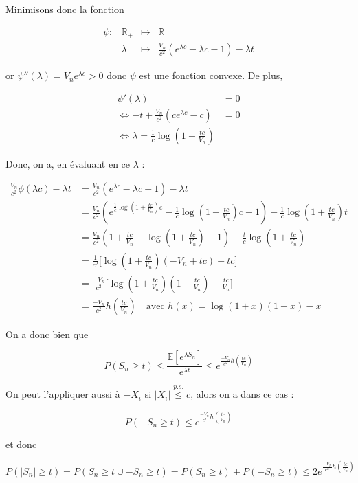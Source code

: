 \documentclass[12pt]{article}
\newcommand{\petitespace}{\vspace{0.5cm}}
\newcommand{\bb}[1]{\mathbb{#1}} %
\newcommand{\R}{\bb{R}} %
\newcommand{\esp}[1]{\bb{ E} \mathopen{}\left[#1\right]} %
\newcommand{\1}{\bb{1}} %
\begin{document}
{Minimisons donc la fonction

 $$
\begin{array}{rrrl} %

  \psi :& \R_+ &\mapsto& \R\\
  & \lambda & \mapsto &  \frac{V_n}{c^2}(e^{\lambda c} -\lambda c-1) - \lambda t \end{array}
$$

or $\psi''(\lambda) = V_ne^{\lambda c} > 0$ donc $\psi$ est une fonction convexe. De plus, 

\begin{align*}
	\psi'(\lambda) &= 0\\
	\iff -t + \frac{V_n}{c^2}(ce^{\lambda c}-c)&=0\\
	\iff \lambda = \frac 1c\log(1+\frac{tc}{V_n})
\end{align*}

Donc, on a, en évaluant en ce $\lambda$ : 

\begin{align*}
	 \frac{V_n}{c^2}\phi( \lambda c) - \lambda t &=   \frac{V_n}{c^2}(e^{\lambda c} -\lambda c-1) - \lambda t \\
	& =  \frac{V_n}{c^2}(e^{ \frac 1c\log(1+\frac{tc}{V_n})c} - \frac 1c\log(1+\frac{tc}{V_n}) c-1) -  \frac 1c\log(1+\frac{tc}{V_n}) t\\
	&=  \frac{V_n}{c^2}( 1+\frac{tc}{V_n} - \log(1+\frac{tc}{V_n}) -1 ) + \frac tc\log(1+\frac{tc}{V_n})\\
	& = \frac{1}{c^2}\big[  \log(1+\frac{tc}{V_n})(-V_n + tc) +tc  \big] \\
	& = \frac{-V_n}{c^2}\big[ \log(1+\frac{tc}{V_n})(1 - \frac{tc}{V_n}) -\frac{tc}{V_n}\big] \\
	& =  \frac{-V_n}{c^2} h(\frac{tc}{V_n}) \quad \text{avec $h(x) = \log(1+x)(1+x)-x$}
\end{align*}

On a donc bien que 

$$P(S_n \ge t) \le \frac{\esp{e^{\lambda S_n}}}{e^{\lambda t}} \le e^{\frac{-V_n}{c^2} h(\frac{tc}{V_n})}$$

On peut l'appliquer aussi à $-X_i$ si $|X_i| \overset{p.s.}{\le} c$, alors on a dans ce cas :

$$P(-S_n \ge t) \le e^{\frac{-V_n}{c^2} h(\frac{tc}{V_n})}$$

et donc 

$$ P( |S_n| \ge t) = P(S_n \ge t \cup -S_n \ge t) = P(S_n \ge t) + P(-S_n \ge t) \le 2e^{\frac{-V_n}{c^2} h(\frac{tc}{V_n})} $$




\petitespace}
\end{document}
